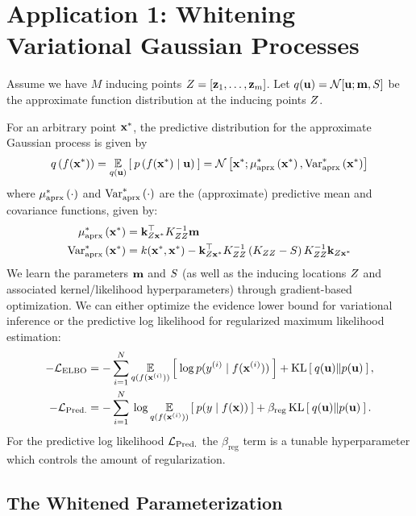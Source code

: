 \section{Application 1: Whitening Variational Gaussian Processes}

Assume we have $M$ inducing points $Z = [\mathbf{z}_1, \ldots, \mathbf{z}_m]$.
Let $q(\bu) = \normaldist{\bu; \bm}{\bS}$ be the approximate function distribution at the inducing points $Z$.

For an arbitrary point $\mathbf{x}^*$, the predictive distribution for the approximate Gaussian process is given by
%
\begin{equation}
  q \left( f(\bxtest) \right) = \Evover{q(\bu)}{ \: p\left( f(\bxtest) \mid \bu \right) \: }
  = \normaldist{ \bxtest; \ameantest{ \bxtest }} { \avartest{ \bxtest }}
  \label{eqn:approx_pred}
\end{equation}
%
where $\mu^*_\text{aprx} \left( \cdot \right)$ and $\text{Var}^*_\text{aprx} \left( \cdot \right)$ are the (approximate) predictive mean and covariance functions, given by:
%
\begin{align}
  \mu^*_\text{aprx} \left( \mathbf{x}^* \right) &= \mathbf{k}_{Z\mathbf{x}^*}^\top K_{ZZ}^{-1} \mathbf{m}
  \label{eqn:approx_pred_mean} \\
  \text{Var}^*_\text{aprx} \left( \mathbf{x}^* \right) &= k(\mathbf{x}^*, \mathbf{x}^*) -
    \mathbf{k}_{Z\mathbf{x}^*}^\top K_{ZZ}^{-1} \left( K_{ZZ} - S \right) K_{ZZ}^{-1} \mathbf{k}_{Z\mathbf{x}^*}
  \label{eqn:approx_pred_covar}
\end{align}
%
We learn the parameters $\mathbf{m}$ and $S$ (as well as the inducing locations $Z$ and associated kernel/likelihood hyperparameters) through gradient-based optimization.
We can either optimize the evidence lower bound \cite{hensman2015scalable} for variational inference or the predictive log likelihood \cite{jankowiak2020parametric} for regularized maximum likelihood estimation:
%
\begin{align}
	-\mathcal L_\text{ELBO} &= -\sum_{i=1}^N \operatorname*{\mathbb{E}}_{q(f(\mathbf{x}^{(i)}))} \left[   \: \log p( y^{(i)} \mid f(\mathbf{x}^{(i)}) ) \:  \right] + \operatorname*{KL} \left[ \:  q(\mathbf{u})  \Vert  p(\mathbf{u})  \: \right],
	\label{eqn:elbo}
	\\
	-\mathcal L_\text{Pred.} &= -\sum_{i=1}^N \: \log \operatorname*{\mathbb{E}}_{q(f(\mathbf{x}^{(i)}))} \left[   \: p( y \mid f(\mathbf{x}) ) \:  \right] + \beta_\text{reg} \operatorname*{KL} \left[ \:  q(\mathbf{u})  \Vert  p(\mathbf{u})  \: \right].
	\label{eqn:predll}
\end{align}
%
For the predictive log likelihood $\mathcal L_\text{Pred.}$ the $\beta_\text{reg}$ term is a tunable hyperparameter which controls the amount of regularization.



\subsection{The Whitened Parameterization}

